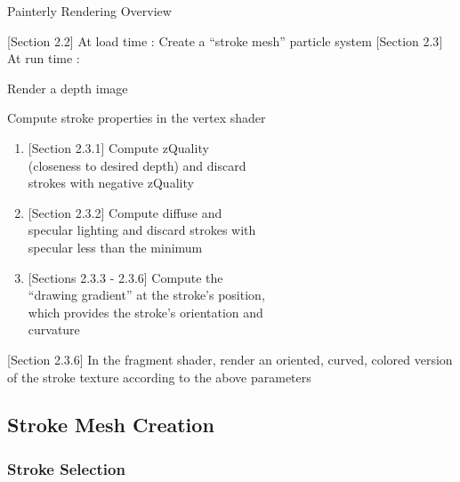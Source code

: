 \documentclass[conference]{acmsiggraph}
\begin{document}
\begin{algorithm}
\DontPrintSemicolon
\caption{Painterly Rendering Overview}
  {[}Section 2.2{]} At load time :  {
     {
      Create a ``stroke mesh'' particle system
    }
  }
  {[}Section 2.3{]} At run time :  {
    Render a depth image \\
     {

       {

         {
          Compute stroke properties in the vertex shader \\
          \begin{enumerate}
            \item {[}Section 2.3.1{]} Compute zQuality \\(closeness to
              desired depth) and discard \\ strokes with negative zQuality
            \item  {[}Section 2.3.2{]} Compute diffuse and \\ specular
              lighting and discard strokes with \\ specular less than the
              minimum
            \item {[}Sections 2.3.3 - 2.3.6{]} Compute the \\
              ``drawing gradient'' at the stroke's position, \\ which provides
              the stroke's orientation and \\ curvature
          \end{enumerate}

          {[}Section 2.3.6{]} In the fragment shader, render an oriented,
          curved, colored version of the stroke texture according to the
          above parameters
        }

      }

    }
  }
\end{algorithm}

\subsection{Stroke Mesh Creation}

\subsubsection{Stroke Selection}
\end{document}

